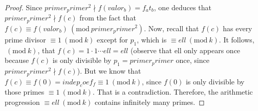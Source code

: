 \documentclass[a4paper, 12pt]{article}
\theoremstyle{definition}
\theoremstyle{remark}
\newcommand{\Mod}[1]{\ (\mathrm{mod}\ #1)} %
\begin{document}
\begin{proof}
Since ${primer_primer}^2\nmid f({valor_b})={f_at_b}$, one deduces that ${primer_primer}^2\nmid f(c)$ from the fact that $f(c)\equiv f({valor_b})\Mod{{primer_primer}^2}$. Now, recall that $f(c)$ has every prime divisor $\equiv 1 \Mod{{k}}$ except for $p_1$, which is $\equiv {ell}\Mod{{k}}$. It follows,$\Mod{{k}}$, that $f(c)=1\cdot1\cdots{ell}={ell}$ (observe that {ell} only appears once because $f(c)$ is only divisible by $p_1={primer_primer}$ once, since ${primer_primer}^2\nmid f(c)$). But we know that $f(c)\equiv f(0)={indep_coef_f}\equiv1\Mod{{k}}$, since $f(0)$ is only divisible by those primes $\equiv 1\Mod{{k}}$. That is a contradiction. Therefore, the arithmetic progression $\equiv {ell}\Mod{{k}}$ contains infinitely many primes.
\end{proof}

\newpage

\thispagestyle{empty}


\end{document}
